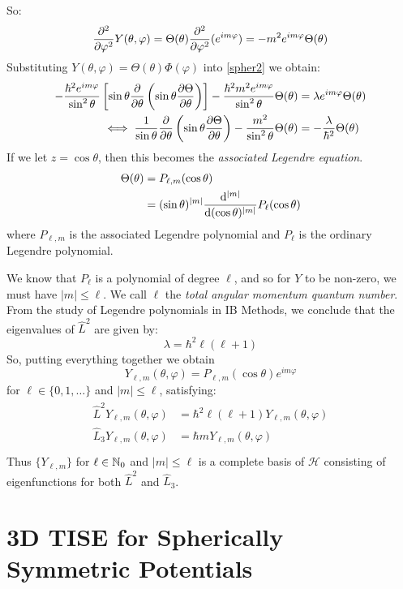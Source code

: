 \documentclass[../main.tex]{subfiles}
\begin{document}
So:
\[
  \pderiv[2]{}{\varphi} Y(\theta, \varphi) = \Theta(\theta) \pderiv[2]{}{\varphi}(e^{im\varphi}) = -m^2 e^{im\varphi} \Theta(\theta)
\]
Substituting $Y(\theta, \varphi) = \Theta(\theta) \Phi(\varphi)$ into \cref{spher2} we obtain:
\begin{align*}
  -\frac{\hbar^2 e^{im\varphi}}{\sin^2 \theta} \left[\sin \theta \pderiv{}{\theta}\left(\sin \theta \pderiv{\Theta}{\theta}\right)\right] - \frac{\hbar^2 m^2e^{im\varphi}}{\sin^2 \theta} \Theta(\theta) &= \lambda e^{im\varphi}\Theta(\theta) \\
  \iff \frac{1}{\sin \theta} \pderiv{}{\theta}\left(\sin \theta \pderiv{\Theta}{\theta}\right) - \frac{m^2}{\sin^2 \theta}\Theta(\theta) &= - \frac{\lambda}{\hbar^2}\Theta(\theta)
\end{align*}
If we let $z = \cos \theta$, then this becomes the \textit{associated Legendre equation}.
\begin{align*}
  \Theta(\theta) &= P_{\ell, m}(\cos \theta) \\
                 &= (\sin \theta)^{|m|} \deriv[|m|]{}{(\cos \theta)} P_{\ell}(\cos \theta)
\end{align*}
where $P_{\ell, m}$ is the associated Legendre polynomial and $P_{\ell}$ is the ordinary Legendre polynomial.

We know that $P_{\ell}$ is a polynomial of degree $\ell$, and so for $Y$ to be non-zero, we must have $|m| \leq \ell$.
We call $\ell$ the \textit{total angular momentum quantum number}.
From the study of Legendre polynomials in IB Methods, we conclude that the eigenvalues of $\hat{L}^2$ are given by:
\[
  \lambda = \hbar^2 \ell(\ell + 1)
\]
So, putting everything together we obtain
\[
  Y_{\ell, m}(\theta, \varphi) = P_{\ell, m}(\cos \theta)e^{im\varphi}
\]
for $\ell \in \{0, 1, \ldots\}$ and $|m| \leq \ell$, satisfying:
\begin{align} \label{Y2Soln}
  \begin{split}
    \hat{L}^2 Y_{\ell, m}(\theta, \varphi) &= \hbar^2 \ell(\ell + 1)Y_{\ell, m}(\theta, \varphi) \\
    \hat{L}_3 Y_{\ell, m}(\theta, \varphi) &= \hbar m Y_{\ell, m}(\theta, \varphi) \\
  \end{split}
\end{align}
Thus $\{Y_{\ell, m}\}$ for $\ell \in \mathbb{N}_0$ and $|m| \leq \ell$ is a complete basis of $\mathcal{H}$ consisting of eigenfunctions for both $\hat{L}^2$ and $\hat{L}_3$.
\section{3D TISE for Spherically Symmetric Potentials}
\end{document}
